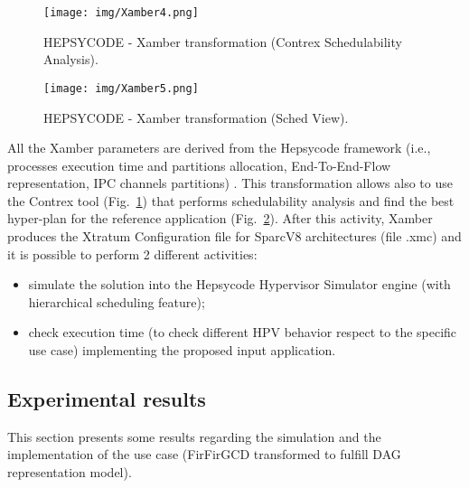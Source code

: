 %
%
\begin{landscape}
\begin{figure}[htbp]
	\centerline{\texttt{[image: img/Xamber4.png]}}
	\caption{HEPSYCODE - Xamber transformation (Contrex Schedulability Analysis).}
	\label{xamber_hepcysode_10}
\end{figure}
\end{landscape}
%
%
\begin{landscape}
\begin{figure}[htbp]
	\centerline{\texttt{[image: img/Xamber5.png]}}
	\caption{HEPSYCODE - Xamber transformation (Sched View).}
	\label{xamber_hepcysode_11}
\end{figure}
\end{landscape}
%
\newpage
All the Xamber parameters are derived from the Hepsycode framework (i.e., processes execution time and partitions allocation, End-To-End-Flow representation, IPC channels partitions) .
This transformation allows also to use the Contrex tool (Fig.~\ref{xamber_hepcysode_10}) that performs schedulability analysis and find the best hyper-plan for the reference application (Fig.~\ref{xamber_hepcysode_11}). After this activity, Xamber produces the Xtratum Configuration file for SparcV8 architectures (file .xmc) and it is possible to perform 2 different activities: 
%
\begin{itemize}
    \item simulate the solution into the Hepsycode Hypervisor Simulator engine (with hierarchical scheduling feature);
    \item check execution time (to check different HPV behavior respect to the specific use case) implementing the proposed input application.
\end{itemize}
%
\subsection{Experimental results}
%
This section presents some results regarding the simulation and the implementation of the use case (FirFirGCD transformed to fulfill DAG representation model). \par
%
